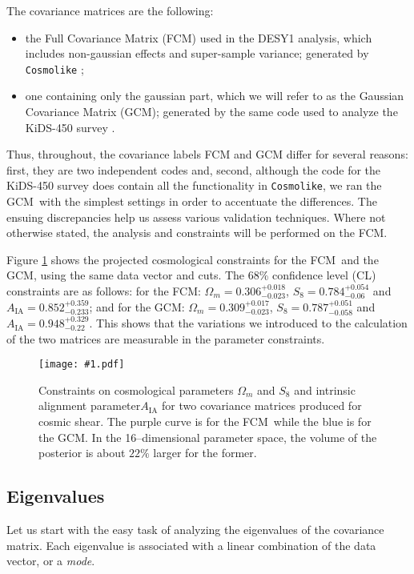 \documentclass[aps, prd, twocolumn, superscriptaddress, nofootinbib, amssymb, amsmath]{revtex4-2}
\newcommand{\sfig}[3]{
	\texttt{[image: \#1.pdf]}
	\caption{#3}
	\label{fig:#1}
}
\newcommand{\Sfig}[3]{
	\begin{figure}[#1]
		\sfig{#2}{\columnwidth}{#3}
	\end{figure}
}
\newcommand{\rf}[1]{Figure \ref{fig:#1}}
\newcommand\full{the FCM}
\newcommand\gaussian{the GCM}
\begin{document}
The covariance matrices are the following:
\begin{itemize}
	\item the Full Covariance Matrix (FCM) used in the DESY1 analysis, which includes non-gaussian effects and super-sample variance; generated by \texttt{Cosmolike} \cite{Krause:2016jvl};
	\item one containing only the gaussian part, which we will refer to as the Gaussian Covariance Matrix (GCM); generated by the same code used to analyze the KiDS-450 survey \cite{Kohlinger:2017sxk, Joachimi:2020blm}.
\end{itemize}
Thus, throughout, the covariance labels FCM and GCM differ for several reasons: first, they are two independent codes	and, second, although the code for the KiDS-450 survey does contain all the functionality in \texttt{Cosmolike}, we ran \gaussian\ with the simplest settings in order to accentuate the differences. The ensuing discrepancies help us assess various validation techniques. Where not otherwise stated, the analysis and constraints will be performed on \full.

\rf{Y1-constraints_wmS8A} shows the projected cosmological constraints for \full\ and \gaussian, using the same data vector and cuts. The 68\% confidence level (CL) constraints are as follows: for \full: $\Omega_m = 0.306^{+ 0.018}_{- 0.023}$, $S_8 = 0.784^{+ 0.054}_{- 0.06}$ and $A_{\text{IA}} = 0.852^{+ 0.359}_{- 0.233}$; and for \gaussian: $\Omega_m = 0.309^{+ 0.017}_{- 0.023}$, $S_8 = 0.787^{+ 0.051}_{- 0.058}$ and $A_{\text{IA}} = 0.948^{+ 0.329}_{- 0.22}$. This shows that the variations we introduced to the calculation of the two matrices are measurable in the parameter constraints.

\Sfig{thbp}{Y1-constraints_wmS8A}{Constraints on cosmological parameters $\Omega_m$ and $S_8$ and intrinsic alignment parameter$A_{\text{IA}}$ for two covariance matrices produced for cosmic shear. The purple curve is for \full\ while the blue is for \gaussian. In the 16--dimensional parameter space, the volume of the posterior is about $22\%$ larger for the former.}

\subsection{Eigenvalues}\label{subsec:eigenvalues}

Let us start with the easy task of analyzing the eigenvalues of the covariance matrix. Each eigenvalue is associated with a linear combination of the data vector, or a \emph{mode}.
\end{document}
